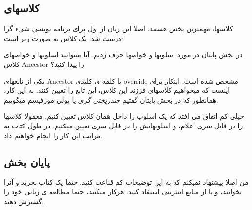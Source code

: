 \documentclass[14pt,a4paper]{memoir}
\begin{document}
	\subsection{کلاسهای }\label{cppclasses} 
	 
	 کلاسها، مهمترین بخش  هستند. اصلا این زبان از اول برای برنامه نویسی شیء گرا درست شد. یک کلاس به صورت زیر است:
	 
	 
	 
	 		  	 	 \begin{latin}
	 	
	 \end{latin} 
	 
	 
	 
در بخش پایتان در مورد اسلوبها و خواصها حرف زدیم. آیا میتوانید اسلوبها و خواصهای کلاس Ancestor را پیدا کنید؟

یکی از تابعهای Ancestor با کلمه ی کلیدی override مشخص شده است. اینکار برای اینست که میخواهیم کلاسهای فززند این کلاس، این تابع را تعیین کنند. به این کار، همانطور که در بخش پایتان گفتیم \textit{چندریختی گری} یا پولی مورفیسم میگوییم.

خیلی کم اتفاق می افتد که یک اسلوب را داخل همان کلاس تعیین کنیم. معمولا کلاسها را در فایل سری اعلام، و اسلوبهایش را در فایل سری تعیین میکنیم. در طول کتاب به مراتب این کار را انجام خواهیم داد.


	 
	 
	 
	 \subsection{پایان بخش }
	 
	من اصلا پیشنهاد نمیکنم که به این توضیحات کم قناعت کنید. حتما یک کتاب بخرید و آنرا بخوانید، و یا از منابع اینترنتی استفاد کنید. هرکار میکنید، حتما مطالعه ی زبانی خود را گسترش دهید.
	
\end{document}

